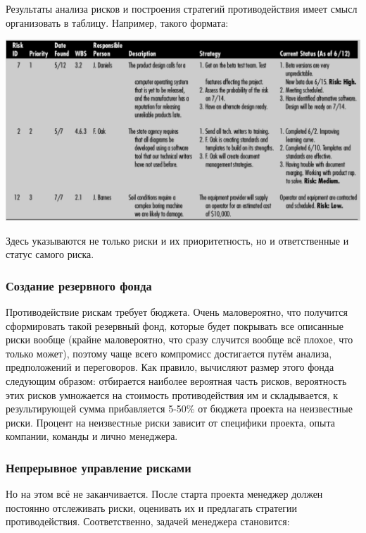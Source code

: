 \documentclass{../../text-style}
\begin{document}
Результаты анализа рисков и построения стратегий противодействия имеет смысл организовать в таблицу. Например, такого формата:

\begin{center}
    \includegraphics[width=\textwidth]{riskExample.png}
\end{center}

Здесь указываются не только риски и их приоритетность, но и ответственные и статус самого риска.

\subsubsection{Создание резервного фонда}

Противодействие рискам требует бюджета. Очень маловероятно, что получится сформировать такой резервный фонд, которые будет покрывать все описанные риски вообще (крайне маловероятно, что сразу случится вообще всё плохое, что только может), поэтому чаще всего компромисс достигается путём анализа, предположений и переговоров. Как правило, вычисляют размер этого фонда следующим образом: отбирается наиболее вероятная часть рисков, вероятность этих рисков умножается на стоимость противодействия им и складывается, к результирующей сумма прибавляется 5-50\% от бюджета проекта на неизвестные риски. Процент на неизвестные риски зависит от специфики проекта, опыта компании, команды и лично менеджера. 

\subsubsection{Непрерывное управление рисками}

Но на этом всё не заканчивается. После старта проекта менеджер должен постоянно отслеживать риски, оценивать их и предлагать стратегии противодействия. Соответственно, задачей менеджера становится:
\end{document}
